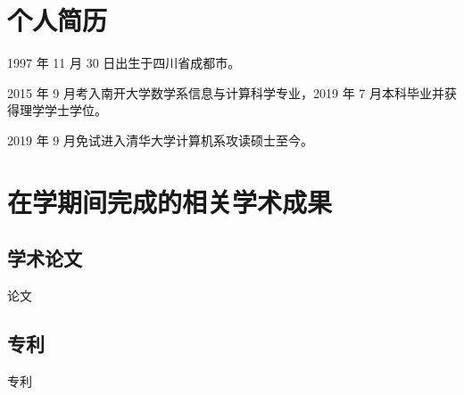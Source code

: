 
\begin{resume}

  \section*{个人简历}

  1997 年 11 月 30 日出生于四川省成都市。

  2015 年 9 月考入南开大学数学系信息与计算科学专业，2019 年 7 月本科毕业并获得理学学士学位。

  2019 年 9 月免试进入清华大学计算机系攻读硕士至今。


  \section*{在学期间完成的相关学术成果}

  \subsection*{学术论文}

  \begin{achievements}
    \item 论文
  \end{achievements}


  \subsection*{专利}

  \begin{achievements}
    \item 专利
  \end{achievements}

\end{resume}
